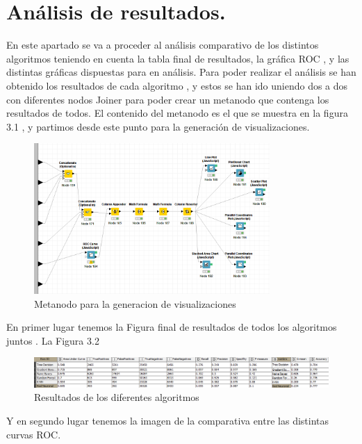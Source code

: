 	\section[Análisis de resultados]{Análisis de resultados.}
	
	En este apartado se va a proceder al análisis comparativo de los distintos algoritmos teniendo en cuenta la tabla final de resultados, 
	la gráfica ROC , y las distintas gráficas dispuestas para en análisis. Para poder realizar el análisis se han obtenido los resultados de cada algoritmo ,
	y estos se han ido uniendo dos a dos con diferentes nodos Joiner para 
	poder crear un metanodo que contenga los resultados de todos. El contenido del metanodo es el que se muestra en la figura 3.1 , y partimos desde este punto para la generación de visualizaciones. 	\\

	\begin{figure}[htb]
		\centering
		\includegraphics[width=0.8\textwidth]{./imagenes/36}
		\caption{Metanodo para la generacion de visualizaciones} \label{fig:1}
	\end{figure}

	En primer lugar tenemos la Figura final de resultados de todos los algoritmos juntos . La Figura 3.2

	\begin{figure}[htb]
		\centering
		\includegraphics[width=1.0\textwidth]{./imagenes/34}
		\caption{Resultados de los diferentes algoritmos} \label{fig:1}
	\end{figure}

	Y en segundo lugar tenemos la imagen de la comparativa entre las distintas curvas ROC. 


